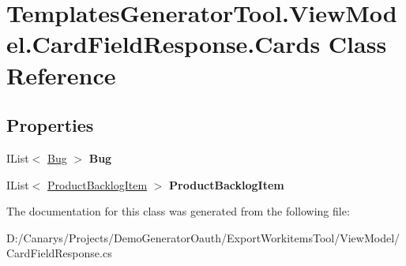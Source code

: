 \hypertarget{class_templates_generator_tool_1_1_view_model_1_1_card_field_response_1_1_cards}{}\section{Templates\+Generator\+Tool.\+View\+Model.\+Card\+Field\+Response.\+Cards Class Reference}
\label{class_templates_generator_tool_1_1_view_model_1_1_card_field_response_1_1_cards}
\subsection*{Properties}
\begin{DoxyCompactItemize}
\item 
\mbox{\label{class_templates_generator_tool_1_1_view_model_1_1_card_field_response_1_1_cards_a59c1460c2bc307f9b18ca95a83dade81}} 
I\+List$<$ \mbox{\hyperlink{class_templates_generator_tool_1_1_view_model_1_1_card_field_response_1_1_bug}{Bug}} $>$ {\bfseries Bug}
\item 
\mbox{\label{class_templates_generator_tool_1_1_view_model_1_1_card_field_response_1_1_cards_a3e6190a13bface2f2cfaf7541a855f1e}} 
I\+List$<$ \mbox{\hyperlink{class_templates_generator_tool_1_1_view_model_1_1_card_field_response_1_1_product_backlog_item}{Product\+Backlog\+Item}} $>$ {\bfseries Product\+Backlog\+Item}
\end{DoxyCompactItemize}


The documentation for this class was generated from the following file\+:\begin{DoxyCompactItemize}
\item 
D\+:/\+Canarys/\+Projects/\+Demo\+Generator\+Oauth/\+Export\+Workitems\+Tool/\+View\+Model/Card\+Field\+Response.\+cs\end{DoxyCompactItemize}
